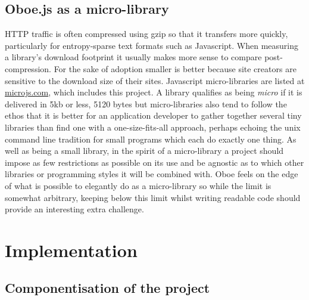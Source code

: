 \documentclass[12pt, ]{article}
\let\stdsection\section
\renewcommand\section{\newpage\stdsection}
\begin{document}
\subsection{Oboe.js as a
micro-library}\label{oboe.js-as-a-micro-library}

HTTP traffic is often compressed using gzip so that it transfers more
quickly, particularly for entropy-sparse text formats such as
Javascript. When measuring a library's download footprint it usually
makes more sense to compare post-compression. For the sake of adoption
smaller is better because site creators are sensitive to the download
size of their sites. Javascript micro-libraries are listed at
\href{http://microjs.com}{microjs.com}, which includes this project. A
library qualifies as being \emph{micro} if it is delivered in 5kb or
less, 5120 bytes but micro-libraries also tend to follow the ethos that
it is better for an application developer to gather together several
tiny libraries than find one with a one-size-fits-all approach, perhaps
echoing the unix command line tradition for small programs which each do
exactly one thing. As well as being a small library, in the spirit of a
micro-library a project should impose as few restrictions as possible on
its use and be agnostic as to which other libraries or programming
styles it will be combined with. Oboe feels on the edge of what is
possible to elegantly do as a micro-library so while the limit is
somewhat arbitrary, keeping below this limit whilst writing readable
code should provide an interesting extra challenge.

\section{Implementation}\label{implementation}

\subsection{Componentisation of the
project}\label{componentisation-of-the-project}
\end{document}
